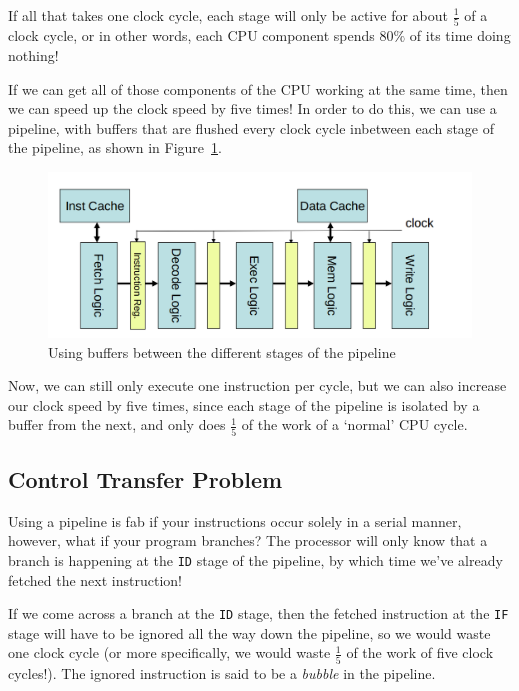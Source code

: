 If all that takes one clock cycle, each stage will only be active for about
$\frac{1}{5}$ of a clock cycle, or in other words, each CPU component spends
$80\%$ of its time doing nothing!

If we can get all of those components of the CPU working at the same time, then
we can speed up the clock speed by five times! In order to do this, we can use a
pipeline, with buffers that are flushed every clock cycle inbetween each stage
of the pipeline, as shown in Figure~\ref{basic-pipeline}.


\begin{figure}[ht]
  \centering
  \includegraphics[width=\textwidth]{images/basic-pipeline}
  \caption{Using buffers between the different stages of the pipeline}
  \label{basic-pipeline}
\end{figure}

Now, we can still only execute one instruction per cycle, but we can also
increase our clock speed by five times, since each stage of the pipeline is
isolated by a buffer from the next, and only does $\frac{1}{5}$ of the work of a
`normal' CPU cycle.

\subsection{Control Transfer Problem}

Using a pipeline is fab if your instructions occur solely in a serial manner,
however, what if your program branches? The processor will only know that a
branch is happening at the \texttt{ID} stage of the pipeline, by which time
we've already fetched the next instruction!

If we come across a branch at the \texttt{ID} stage, then the fetched
instruction at the \texttt{IF} stage will have to be ignored all the way down
the pipeline, so we would waste one clock cycle (or more specifically, we would
waste $\frac{1}{5}$ of the work of five clock cycles!). The ignored instruction
is said to be a \textit{bubble} in the pipeline.

